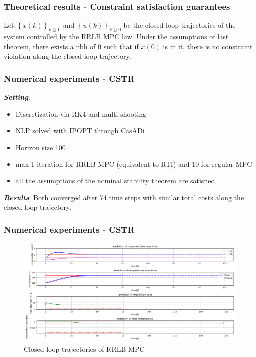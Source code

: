 \documentclass[10pt]{beamer}
\begin{document}
\begin{frame}
    \frametitle{Theoretical results - Constraint satisfaction guarantees}
    \begin{theorem}
        Let $\left\{ x(k) \right\}_{k\geq 0}$ and $\left\{ u(k) \right\}_{k\geq 0}$ be the closed-loop trajectories of the system controlled by the RRLB MPC law.
        Under the assumptions of last theorem, there exists a nbh of 0 such that if $x(0)$ is in it, there is no constraint violation along the closed-loop trajectory.
    \end{theorem}
\end{frame}

\begin{frame}
    \frametitle{Numerical experiments - CSTR}
    \textit{\textbf{Setting}}:
    \begin{itemize}[label=\textbullet]
        \item Discretization via RK4 and multi-shooting
        \item NLP solved with IPOPT through CasADi
        \item Horizon size 100
        \item max 1 iteration for RRLB MPC (equivalent to RTI) and 10 for regular MPC
        \item \checkmark all the assumptions of the nominal stability theorem are satisfied
    \end{itemize}

    \textbf{\textit{Results}}:
    Both converged after 74 time steps with similar total costs along the closed-loop trajectory.

\end{frame}

\begin{frame}
    \frametitle{Numerical experiments - CSTR}
    \begin{figure}[H]
        \centering
        \includegraphics[width=1.0\textwidth]{../cstr_package/rrlb_mpc.png}
        \caption*{Closed-loop trajectories of RRLB MPC}
    \end{figure}
\end{frame}
\end{document}
